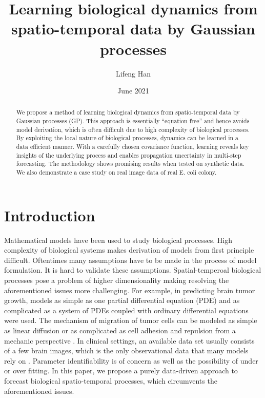 \documentclass[11pt, reqno]{amsart}
\title[Learning biological dynamics]{Learning biological dynamics from spatio-temporal data by Gaussian processes}
\author{Lifeng Han}
\date{June 2021}
\begin{document}
\onehalfspacing

\begin{abstract}
We propose a method of learning biological dynamics from spatio-temporal data by Gaussian processes (GP). This approach is essentially ``equation free'' and hence avoids model derivation, which is often difficult due to high complexity of biological processes. By exploiting the local nature of biological processes, dynamics can be learned in a data efficient manner. With a carefully chosen covariance function, learning reveals key insights of the underlying process and enables propagation uncertainty in multi-step forecasting. The methodology shows promising results when tested on synthetic data. We also demonstrate a case study on real image data of real E. coli colony.          
\end{abstract}

\maketitle

\section{Introduction}
Mathematical models have been used to study biological processes. High complexity of biological systems makes derivation of models from first principle difficult. Oftentimes many assumptions have to be made in the process of model formulation.  It is hard to validate these assumptions. Spatial-temperoal biological processes pose a problem of higher dimensionality making resolving the aforementioned issues more challenging. For example, in predicting brain tumor growth, models as simple as one partial differential equation (PDE) \citep{Jackson2015a} and as complicated as a system of PDEs coupled with ordinary differential equations \citep{Eikenberry2009} were used. The mechanism of migration of tumor cells can be modeled as simple as linear diffusion  or as complicated as cell adhesion and repulsion from a mechanic perspective \citep{khain2012migration,aubert2008model}. In clinical settings, an available data set usually consists of a few brain images, which is the only observational data that many models rely on \citep{lipkova2019personalized,Kostelich2011a,Jackson2015a}. Parameter identifiability is of concern as well as the possibility of under or over fitting. In this paper, we propose a purely data-driven approach to forecast biological spatio-temporal processes, which circumvents the aforementioned issues.              
\end{document}
